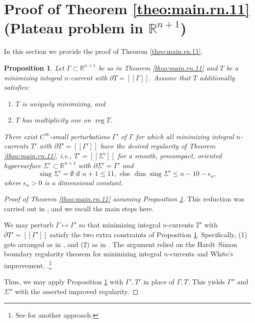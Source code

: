 \documentclass[11pt, letterpaper, reqno]{amsart}
\numberwithin{equation}{section}
\newtheorem{Prop}[Def]{Proposition}
\theoremstyle{remark}
\newcommand{\RR}{\mathbb{R}}
\newcommand{\reg}{\operatorname{reg}}
\newcommand{\sing}{\operatorname{sing}}
\newcommand{\llbracket}{[\![}
\newcommand{\rrbracket}{]\!]}
\begin{document}

\section{Proof of Theorem \ref{theo:main.rn.11} (Plateau problem in $\RR^{n+1}$)} \label{sec:plateau.rn}

In this section we provide the proof of Theorem \ref{theo:main.rn.11}. 

\begin{Prop} \label{prop:plateau.rn}
	Let $\Gamma \subset \RR^{n+1}$ be as in Theorem \ref{theo:main.rn.11} and $T$ be a minimizing integral $n$-current with $\partial T = \llbracket \Gamma \rrbracket$. Assume that $T$ additionally satisfies:
	\begin{enumerate}
		\item[(1)] $T$ is uniquely minimizing, and
		\item[(2)] $T$ has multiplicity one on $\reg T$.
	\end{enumerate}
	There exist $C^\infty$-small perturbations $\Gamma'$ of $\Gamma$ for which all minimizing integral $n$-currents $T'$ with $\partial T' = \llbracket \Gamma' \rrbracket$ have the desired regularity of Theorem \ref{theo:main.rn.11}, i.e., $T' = \llbracket \Sigma' \rrbracket$ for a smooth, precompact, oriented hypersurface $\Sigma' \subset \RR^{n+1}$ with $\partial \Sigma' = \Gamma'$ and
	\[ \sing \Sigma' = \emptyset \text{ if } n+1 \leq 11, \text{ else } \dim \sing \Sigma' \leq n-10-\epsilon_n, \]
	where $\epsilon_n > 0$ is a dimensional constant.
\end{Prop}

\begin{proof}[Proof of Theorem \ref{theo:main.rn.11} assuming Proposition \ref{prop:plateau.rn}]
This reduction was carried out in \cite[Section 6]{CMS:generic.codim.plus.2}, and we recall the main steps here.

We may perturb  $\Gamma \mapsto \Gamma'$ so that minimizing integral $n$-currents $T'$ with $\partial T' = \llbracket \Gamma' \rrbracket$ satisfy the two extra constraints of Proposition \ref{prop:plateau.rn}. Specifically, (1) gets arranged as in \cite[Section 6.1]{CMS:generic.codim.plus.2}, and (2) as in \cite[Section 6.3]{CMS:generic.codim.plus.2}. The argument relied on the Hardt--Simon boundary regularity theorem for minimizing integral $n$-currents and White's improvement, \cite{Hardt-Simon:boundary-regularity, White:boundary-regularity-multiplicity}.\footnote{See \cite[Proof of Theorem 4.1 assuming Lemmas 4.1, 4.2]{CMS:generic.9.10} for another approach.} 

Thus, we may apply Proposition \ref{prop:plateau.rn} with $\Gamma', T'$ in place of $\Gamma, T$. This yields $\Gamma''$ and $\Sigma''$ with the asserted improved regularity. 
\end{proof}
\end{document}
